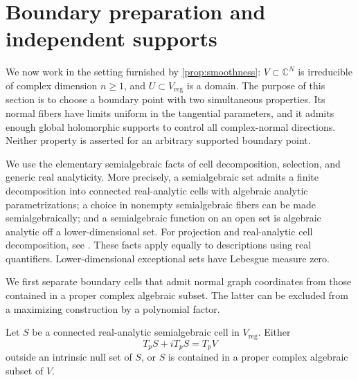 \section{Boundary preparation and independent supports}
\label{sec:preparation}

We now work in the setting furnished by \cref{prop:smoothness}: $V\subset\mathbb{C}^N$ is irreducible of complex dimension $n\geq1$, and $U\subset V_{\mathrm{reg}}$ is a domain.  The purpose of this section is to choose a boundary point with two simultaneous properties.  Its normal fibers have limits uniform in the tangential parameters, and it admits enough global holomorphic supports to control all complex-normal directions. Neither property is asserted for an arbitrary supported boundary point.

We use the elementary semialgebraic facts of cell decomposition, selection, and generic real analyticity.  More precisely, a semialgebraic set admits a finite decomposition into connected real-analytic cells with algebraic analytic parametrizations; a choice in nonempty semialgebraic fibers can be made semialgebraically; and a semialgebraic function on an open set is algebraic analytic off a lower-dimensional set.  For projection and real-analytic cell decomposition, see \cite[Sections~1.1--1.2]{Coste2005}.  These facts apply equally to descriptions using real quantifiers.  Lower-dimensional exceptional sets have Lebesgue measure zero.

We first separate boundary cells that admit normal graph coordinates from those contained in a proper complex algebraic subset.  The latter can be excluded from a maximizing construction by a polynomial factor.

\begin{lemma}
\label{lem:rank-dichotomy}
Let $S$ be a connected real-analytic semialgebraic cell in $V_{\mathrm{reg}}$.  Either
\begin{equation}
 T_pS+iT_pS=T_pV
 \label{eq:generic-cell}
\end{equation}
outside an intrinsic null set of $S$, or $S$ is contained in a proper complex algebraic subset of $V$.
\end{lemma}

